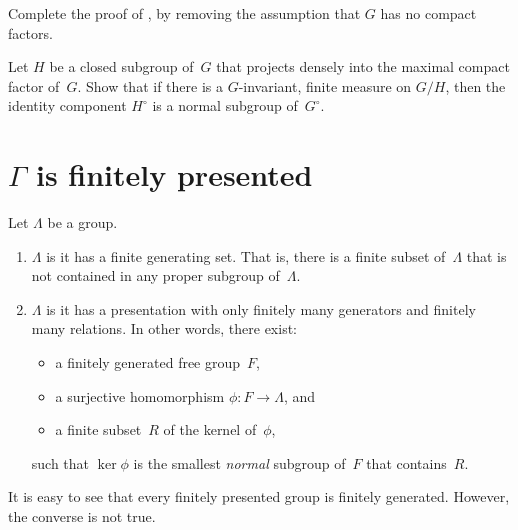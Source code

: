 \begin{exercises}

\item \label{BDT(subspace)cpct}
 Complete the proof of , by
removing the assumption that $G$ has no compact factors.


\item \label{BDT-G/H}
 Let $H$ be a closed subgroup of~$G$ that projects densely
into the maximal compact factor of~$G$.
 Show that if there is a $G$-invariant, finite measure on
$G/H$, then the identity component $H^\circ$ is a normal subgroup
of~$G^\circ$.


\end{exercises}




\section{\texorpdfstring{$\Gamma$ is finitely presented}{Γ is finitely presented}}
\label{finpresSect}

\begin{defns}
Let $\Lambda$ be a group.
\noprelistbreak
	\begin{enumerate}
	\item $\Lambda$ is  it has a finite generating set. That is, there is a finite subset of~$\Lambda$ that is not contained in any proper subgroup of~$\Lambda$.
	\item $\Lambda$ is  it has a presentation with only finitely many generators and finitely many relations. In other words, there exist:
		\begin{itemize}
		\item a finitely generated free group~$F$, 
		\item a surjective homomorphism $\phi \colon F \to \Lambda$,
		and 
		\item a finite subset~$R$ of the kernel of~$\phi$,
		\end{itemize}
	such that $\ker\phi$ is the smallest \emph{normal} subgroup of~$F$ that contains~$R$.
	\end{enumerate}
It is easy to see that every finitely presented group is finitely generated. However, the converse is not true.
\end{defns}

